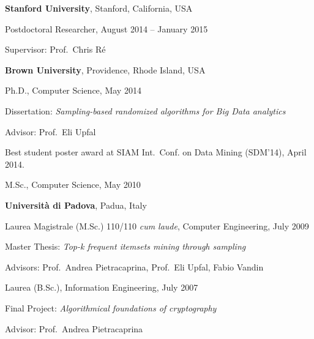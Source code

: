 \documentclass[margin,line]{resume}
\begin{document}
\begin{resume}
{\bf Stanford University}, Stanford, California, USA\\
\vspace*{-.18in}
\begin{list1}
\item[] Postdoctoral Researcher, August 2014 -- January 2015
\begin{list2}
\item Supervisor: Prof.~Chris R\'e
\end{list2}
\end{list1}

{\bf Brown University}, Providence, Rhode Island, USA\\
\vspace*{-.18in}
\begin{list1}
\item[] Ph.D., Computer Science, May 2014
\begin{list2}
\item Dissertation: {\em Sampling-based randomized algorithms for Big Data analytics}
\item Advisor: Prof.~Eli Upfal 
\item Best student poster award at SIAM Int.~Conf. on Data Mining (SDM'14), April 2014.
\end{list2}
\item[] M.Sc., Computer Science, May 2010
\end{list1}

{\bf Universit\`a di Padova}, Padua, Italy\\
\vspace*{-.18in}
\begin{list1}
\item[] Laurea Magistrale (M.Sc.) 110/110 \textit{cum laude}, Computer Engineering, July 2009
\begin{list2}
\item Master Thesis: {\em Top-k frequent itemsets mining through sampling}
\item Advisors: Prof.~Andrea Pietracaprina, Prof.~Eli Upfal, Fabio Vandin
\end{list2}
\item[] Laurea (B.Sc.), Information Engineering, July 2007
\begin{list2}
\item Final Project: {\em Algorithmical foundations of cryptography}
\item Advisor: Prof.~Andrea Pietracaprina
\end{list2}
\end{list1}
\end{resume}
  
\end{document}
